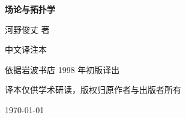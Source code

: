 \begin{titlepage}
\centering
\vspace*{3cm}
{\Huge\bfseries 场论与拓扑学\par}
\vspace{1.2cm}
{\Large 河野俊丈 著\par}
\vspace{0.4cm}
{\large 中文译注本\par}
\vspace{2.5cm}
{\large 依据岩波书店 1998 年初版译出\par}
\vspace{1cm}
{\small 译本仅供学术研读，版权归原作者与出版者所有\par}
\vfill
{\small \today\par}
\end{titlepage}

